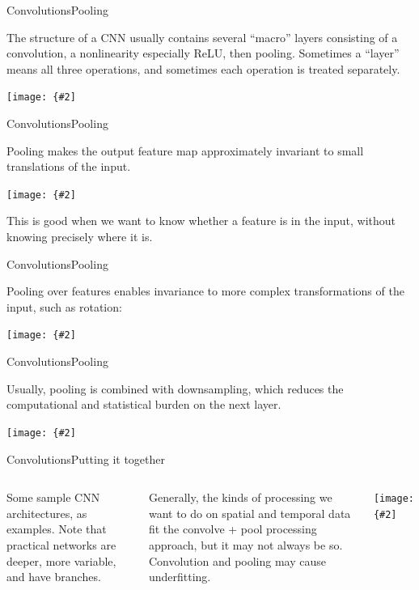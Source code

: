\documentclass[aspectratio=169]{beamer}
\newcommand{\myfig}[3]{\centerline{\texttt{[image: \{\#2]}}}
\begin{document}
\begin{frame}{Convolutions}{Pooling}

The structure of a CNN usually contains several ``macro'' layers
consisting of a convolution, a nonlinearity especially ReLU, then
pooling. Sometimes a ``layer'' means all three operations, and sometimes
each operation is treated separately.

\myfig{2in}{goodfellow-fig9-7}{Goodfellow et al. (2016), Figure 9.7}

\end{frame}


\begin{frame}{Convolutions}{Pooling}

Pooling makes the output feature map approximately \alert{invariant}
to small translations of the input.

\myfig{1.8in}{goodfellow-fig9-8}{Goodfellow et al. (2016), Figure 9.8}

This is good when we want to know \alert{whether} a feature is in the
input, without knowing precisely \alert{where} it is.

\end{frame}


\begin{frame}{Convolutions}{Pooling}

Pooling \alert{over features} enables invariance to more complex
transformations of the input, such as rotation:
\myfig{3in}{goodfellow-fig9-9}{Goodfellow et al. (2016), Figure 9.9}

\end{frame}


\begin{frame}{Convolutions}{Pooling}

Usually, pooling is combined with downsampling, which reduces the
computational and statistical burden on the next layer.

\medskip

\myfig{3in}{goodfellow-fig9-10}{Goodfellow et al. (2016), Figure 9.10}

\end{frame}


\begin{frame}{Convolutions}{Putting it together}

  \begin{columns}

    \column{2in}

    Some sample CNN architectures, as examples.  Note that practical
networks are deeper, more variable, and have branches.

\medskip

Generally, the kinds of processing we want to do on spatial and temporal
data fit the convolve + pool processing approach, but it may not always
be so. Convolution and pooling may cause \alert{underfitting}.

\column{2.5in}

\myfig{2in}{goodfellow-fig9-11}{Goodfellow et al. (2016), Figure 9.11}

  \end{columns}
  
\end{frame}
\end{document}
